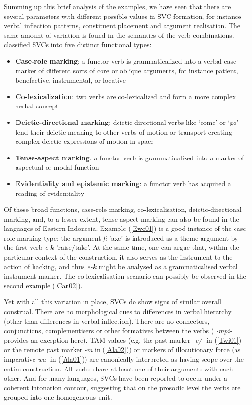 Summing up this brief analysis of the examples, we have seen that there are several parameters with different possible values in SVC formation, for instance verbal inflection patterns, constituent placement and argument realisation. The same amount of variation is found in the semantics of the verb combinations. \citet{givon1991serial} classified SVCs into five distinct functional types:

\begin{footnotesize}
\begin{itemize}
\item \textbf{Case-role marking}: a functor verb is grammaticalized into a verbal case marker of different sorts of core or oblique arguments, for instance patient, benefactive, instrumental, or locative
\item \textbf{Co-lexicalization}: two verbs are co-lexicalized and form a more complex verbal concept
\item \textbf{Deictic-directional marking}: deictic directional verbs like `come' or `go' lend their deictic meaning to other verbs of motion or transport creating complex deictic expressions of motion in space
\item \textbf{Tense-aspect marking}: a functor verb is grammaticalized into a marker of aspectual or modal function
\item \textbf{Evidentiality and epistemic marking}: a functor verb has acquired a reading of evidentiality
\end{itemize}
\end{footnotesize}

Of these broad functions, case-role marking, co-lexicalisation, deictic-directional marking, and, to a lesser extent, tense-aspect marking can also be found in the languages of Eastern Indonesia. Example (\ref{Ewe01}) is a good instance of the case-role marking type: the argument \textit{fi} 'axe' is introduced as a theme argument by the first verb \textit{e-\textbf{k}} 'raise/take'. At the same time, one can argue that, within the particular context of the construction, it also serves as the instrument to the action of hacking, and thus \textit{e-\textbf{k}} might be analysed as a grammaticalised verbal instrument marker. The co-lexicalisation scenario can possibly be observed in the second  example (\ref{Can02}).

Yet with all this variation in place, SVCs do show signs of similar overall construal. There are no morphological cues to differences in verbal hierarchy (other than differences in verbal inflection). There are no connectors, conjunctions, complementisers or other formatives between the verbs ( \textit{-mpi-} provides an exception here). TAM values (e.g. the past marker \textit{-e/-} in (\ref{Twi01}) or the remote past marker \textit{-m} in (\ref{Ala02})) or markers of illocutionary force (as imperative \textit{wa-} in (\ref{Ala01})) are canonically interpreted as having scope over the entire construction. All verbs share at least one of their arguments with each other. And for many languages, SVCs have been reported to occur under a coherent intonation contour, suggesting that on the prosodic level the verbs are grouped into one homogeneous unit.

